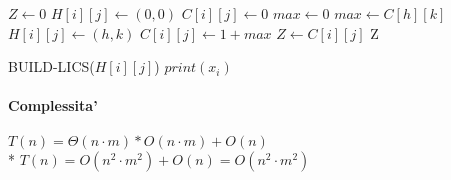 \begin{algorithm}
    \begin{algorithmic}
            \State $Z \gets 0$
                    \State $H[i][j] \gets (0,0)$
                        \State $C[i][j] \gets 0$
                    \Else
                        \State $max \gets 0$
                                    \State $max \gets C[h][k]$
                                    \State $H[i][j] \gets (h,k)$
                                \EndIf
                            \EndFor
                        \EndFor
                        \State $C[i][j] \gets 1 + max$
                            \State $Z \gets C[i][j]$
                        \EndIf
                    \EndIf
                \EndFor
            \EndFor
            \State \Return Z
        \EndProcedure
    \end{algorithmic}
\end{algorithm}

\begin{algorithm}
    \begin{algorithmic}
                \State BUILD-LICS($H[i][j]$)
            \EndIf
            \State $print(x_i)$
        \EndProcedure
    \end{algorithmic}
\end{algorithm}

\paragraph{Complessita'}
$T(n) = \Theta(n \cdot m) * O(n \cdot m) + O(n)$ \\*
$T(n) = O(n^2 \cdot m^2) + O(n) = O(n^2 \cdot m^2)$
